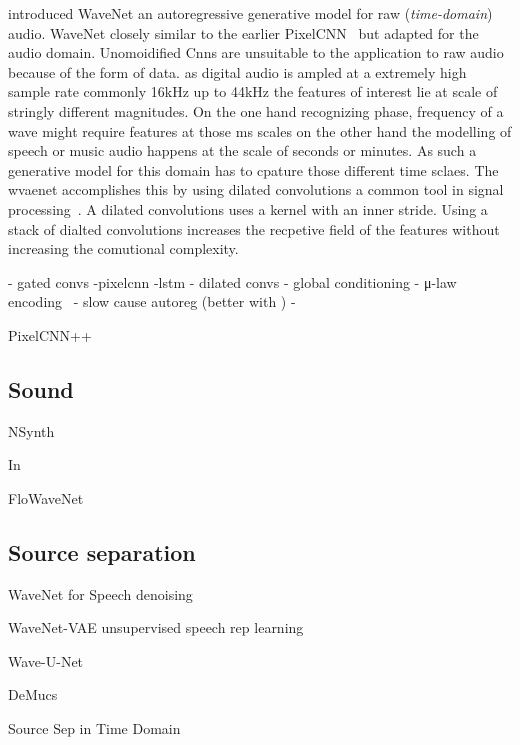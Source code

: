 \cite{vandenoordWaveNet2016} introduced WaveNet an autoregressive generative model for raw (\textit{time-domain}) audio. WaveNet closely similar to the earlier PixelCNN~\cite{vandenoordConditional2016} but adapted for the audio domain. Unomoidified Cnns are unsuitable to the application to raw audio because of the form of data. as digital audio is ampled at a extremely high sample rate commonly 16kHz up to 44kHz the features of interest lie at scale of stringly different magnitudes. On the one hand recognizing phase, frequency of a wave might require features at those ms scales on the other hand the modelling of speech or music audio happens at the scale of seconds or minutes. As such a generative model for this domain has to cpature those different time sclaes. The wvaenet accomplishes this by using dilated convolutions a common tool in signal processing~\cite{dutilleuxImplementation1990}. A dilated convolutions uses a kernel with an inner stride. Using a stack of dialted convolutions increases the recpetive field of the features without increasing the comutional complexity.

- gated convs -pixelcnn -lstm\cite{hochreiterLong1997a}
- dilated convs
- global conditioning
- μ-law encoding~\cite{Recommendation1988}
- slow cause autoreg (better with \cite{paineFast2016})
-

PixelCNN++~\cite{salimansPixelCNN2017}


\subsection{Sound}
NSynth~\cite{kalchbrennerEfficient2018}

In~\cite{prengerWaveGlow2018}

FloWaveNet~\cite{kimFloWaveNet2019a}

\subsection{Source separation}
WaveNet for Speech denoising\cite{rethageWavenet2018}

WaveNet-VAE unsupervised speech rep learning\cite{chorowskiUnsupervised2019}

Wave-U-Net\cite{stollerWaveUNet2018}

DeMucs\cite{defossezDemucs2019}

Source Sep in Time Domain\cite{lluisEndtoend2019}
